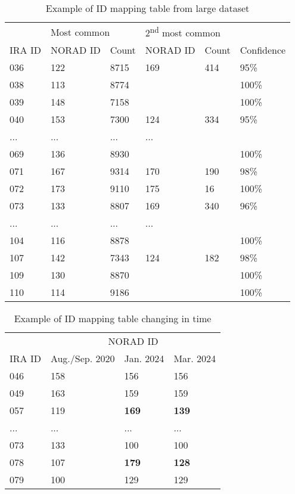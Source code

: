 \begin{table}
    \centering
    \begin{tabular}{l|ll|ll|l}
       & \multicolumn{2}{l|}{Most common} & \multicolumn{2}{l|}{2\textsuperscript{nd} most common} & \\
IRA ID & NORAD ID & Count                 & NORAD ID & Count                                       & Confidence \\ \hline
036 & 122 &  8715 & 169 &   414 & 95\%     \\
038 & 113 &  8774 &     &       & 100\%     \\
039 & 148 &  7158 &     &       & 100\%     \\
040 & 153 &  7300 & 124 &   334 & 95\%     \\
... & ... & ... & ... & \\
069 & 136 &  8930 &     &       & 100\%     \\
071 & 167 &  9314 & 170 &   190 & 98\%     \\
072 & 173 &  9110 & 175 &    16 & 100\%     \\
073 & 133 &  8807 & 169 &   340 & 96\%     \\
... & ... & ... & ... & \\
104 & 116 &  8878 &     &       & 100\%     \\
107 & 142 &  7343 & 124 &   182 &  98\%     \\
109 & 130 &  8870 &     &       & 100\%     \\
110 & 114 &  9186 &     &       & 100\%     \\
    \end{tabular}
    \caption{Example of ID mapping table from large dataset}
    \label{t_des_sat08_table}
\end{table}

\begin{table}
    \centering
    \begin{tabular}{l|lll}
       & \multicolumn{3}{c}{NORAD ID}  \\
IRA ID & Aug./Sep. 2020 & Jan. 2024 & Mar. 2024 \\ \hline
046 & 158 & 156 & 156 \\
049 & 163 & 159 & 159 \\
057 & 119 & \textbf{169} & \textbf{139} \\
... & ... & ... & ... \\
073 & 133 & 100 & 100 \\
078 & 107 & \textbf{179} & \textbf{128} \\
079 & 100 & 129 & 129 \\
    \end{tabular}
    \caption{Example of ID mapping table changing in time}
    \label{t_des_sat08_to_now_table}
\end{table}


